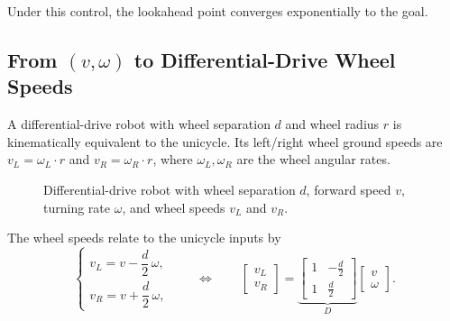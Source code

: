\documentclass[../../master-handout.tex]{subfiles}
\begin{document}
Under this control, the lookahead point converges exponentially to the goal.

\subsection{From $(v, \omega)$ to Differential-Drive Wheel Speeds}

A differential-drive robot with wheel separation $d$ and wheel radius $r$ is
kinematically equivalent to the unicycle. Its left/right wheel ground speeds
are $v_L = \omega_L \cdot r$ and $v_R = \omega_R \cdot r$, where
$\omega_L, \omega_R$ are the wheel angular rates.

\begin{figure}[htbp]
    \centering
    \caption{Differential-drive robot with wheel separation $d$, forward speed
    $v$, turning rate $\omega$, and wheel speeds $v_L$ and $v_R$.}
    \label{fig:diff-drive}
\end{figure}

The wheel speeds relate to the unicycle inputs by
\begin{equation}
    \begin{cases}
        v_L = v - \dfrac{d}{2}\,\omega, \\[1.2ex]
        v_R = v + \dfrac{d}{2}\,\omega,
    \end{cases}
    \qquad \Longleftrightarrow \qquad
    \begin{bmatrix} v_L \\ v_R \end{bmatrix}
    =
    \underbrace{
    \begin{bmatrix}
        1 & -\frac{d}{2} \\
        1 & \frac{d}{2}
    \end{bmatrix}}_{D}
    \begin{bmatrix} v \\ \omega \end{bmatrix}.
\end{equation}
\end{document}
